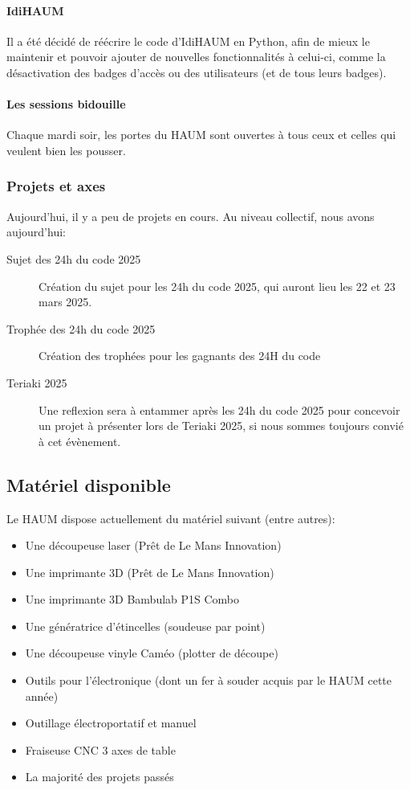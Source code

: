 \documentclass[a4paper, 11pt]{article}
\begin{document}
\begin{appendices}
\paragraph{IdiHAUM} Il a été décidé de réécrire le code d'IdiHAUM en Python, afin de
mieux le maintenir et pouvoir ajouter de nouvelles fonctionnalités à celui-ci, comme la
désactivation des badges d'accès ou des utilisateurs (et de tous leurs badges).

\paragraph{Les sessions bidouille} Chaque mardi soir, les portes du HAUM sont ouvertes
à tous ceux et celles qui veulent bien les pousser.

\subsubsection{Projets et axes}

Aujourd'hui, il y a peu de projets en cours. Au niveau collectif, nous avons aujourd'hui:
\bigskip
\begin{description}
    \item[Sujet des 24h du code 2025] Création du sujet pour les 24h du code 2025, qui auront lieu les 22 et 23 mars 2025.
    \item[Trophée des 24h du code 2025] Création des trophées pour les gagnants des 24H du code
    \item[Teriaki 2025] Une reflexion sera à entammer après les 24h du code 2025 pour concevoir un projet à présenter lors de Teriaki 2025, si nous sommes toujours convié à cet évènement.
\end{description}

\subsection{Matériel disponible}

Le HAUM dispose actuellement du matériel suivant (entre autres):

\begin{itemize}
    \item Une découpeuse laser (Prêt de Le Mans Innovation)
    \item Une imprimante 3D (Prêt de Le Mans Innovation)
    \item Une imprimante 3D Bambulab P1S Combo
    \item Une génératrice d'étincelles (soudeuse par point)
    \item Une découpeuse vinyle Caméo (plotter de découpe)
    \item Outils pour l'électronique (dont un fer à souder acquis par le HAUM cette année)
    \item Outillage électroportatif et manuel
    \item Fraiseuse CNC 3 axes de table
    \item La majorité des projets passés
\end{itemize}


\end{appendices}
\end{document}
